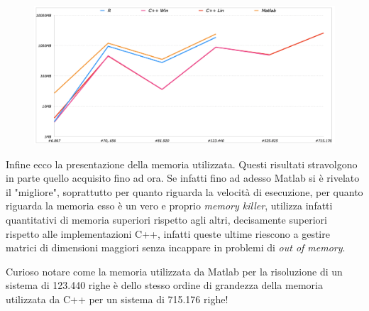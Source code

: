 \documentclass[preprint,12pt]{elsarticle}
\begin{document}
\begin{figure}[H]
	\centering
	\includegraphics[width=\linewidth]{memoria2}
\end{figure}

Infine ecco la presentazione della memoria utilizzata. Questi risultati stravolgono in parte quello acquisito fino ad ora.
Se infatti fino ad adesso Matlab si è rivelato il "migliore", soprattutto per quanto riguarda la velocità di esecuzione, per quanto riguarda la memoria esso è un vero e proprio \textit{memory killer}, utilizza infatti quantitativi di memoria superiori rispetto agli altri, decisamente superiori rispetto alle implementazioni C++, infatti queste ultime riescono a gestire matrici di dimensioni maggiori senza incappare in problemi di \textit{out of memory}.

Curioso notare come la memoria utilizzata da Matlab per la risoluzione di un sistema di 123.440 righe è dello stesso ordine di grandezza della memoria utilizzata da C++ per un sistema di 715.176 righe!
\end{document}
